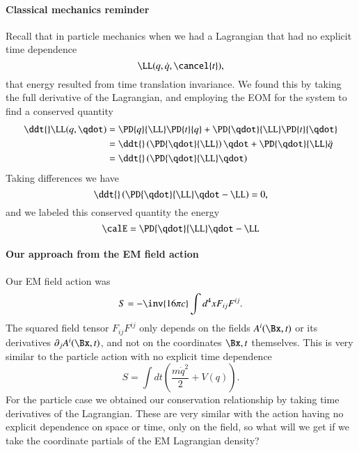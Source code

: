 \paragraph{Classical mechanics reminder}
%
Recall that in particle mechanics when we had a Lagrangian that had no explicit time dependence
%
\begin{equation}\label{eqn:relativisticElectrodynamicsL21b:380}
\LL(q, \dot{q}, \cancel{t}),
\end{equation}
%
that energy resulted from time translation invariance.  We found this by taking the full derivative of the Lagrangian, and employing the EOM for the system to find a conserved quantity
%
\begin{equation}\label{eqn:relativisticElectrodynamicsL21b:560}
\begin{aligned}
\ddt{} \LL(q, \qdot)
&=
\PD{q}{\LL} \PD{t}{q}
+\PD{\qdot}{\LL} \PD{t}{\qdot} \\
&=
\ddt{} \left( \PD{\qdot}{\LL} \right) \qdot
+\PD{\qdot}{\LL} \ddot{q} \\
&=
\ddt{} \left( \PD{\qdot}{\LL} \qdot \right)
\end{aligned}
\end{equation}
%
Taking differences we have
%
\begin{equation}\label{eqn:relativisticElectrodynamicsL21b:400}
\ddt{} \left( \PD{\qdot}{\LL} \qdot -\LL \right) = 0,
\end{equation}
%
and we labeled this conserved quantity the energy
%
\begin{equation}\label{eqn:relativisticElectrodynamicsL21b:420}
\calE = \PD{\qdot}{\LL} \qdot -\LL
\end{equation}
%
\paragraph{Our approach from the EM field action}
%
Our EM field action was
%
\begin{equation}\label{eqn:relativisticElectrodynamicsL21b:500}
S = -\inv{16 \pi c} \int d^4 x F_{i j} F^{i j}.
\end{equation}
%
The squared field tensor \(F_{i j} F^{i j}\) only depends on the fields \(A^i(\Bx, t)\) or its derivatives \(\partial_j A^i(\Bx, t)\), and not on the coordinates \(\Bx, t\) themselves.  This is very similar to the particle action with no explicit time dependence
%
\begin{equation}\label{eqn:relativisticElectrodynamicsL21b:520}
S = \int dt \left( \frac{m \dot{q}^2}{2} + V(q) \right).
\end{equation}
%
For the particle case we obtained our conservation relationship by taking time derivatives of the Lagrangian.  These are very similar with the action having no explicit dependence on space or time, only on the field, so what will we get if we take the coordinate partials of the EM Lagrangian density?

